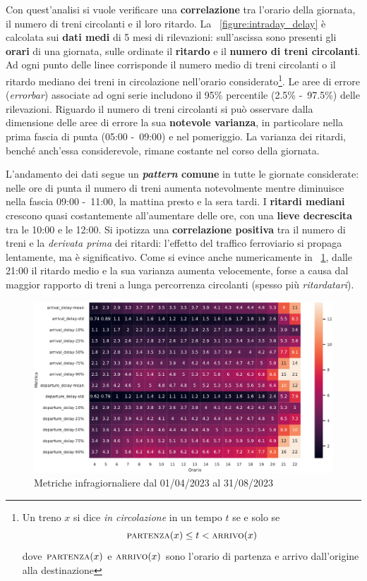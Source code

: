 \documentclass[12pt,italian]{report}
\begin{document}
Con quest'analisi si vuole verificare una \textbf{correlazione} tra
l'orario della giornata, il numero di treni circolanti e il loro
ritardo.  La \figurename~\ref{figure:intraday_delay} è calcolata sui
\textbf{dati medi} di 5 mesi di rilevazioni: sull'ascissa sono
presenti gli \textbf{orari} di una giornata, sulle ordinate il
\textbf{ritardo} e il \textbf{numero di treni circolanti}.  Ad ogni
punto delle linee corrisponde il numero medio di treni circolanti o il
ritardo mediano dei treni in circolazione nell'orario
considerato\footnote{Un treno $x$ si dice \textit{in circolazione} in
    un tempo $t$ se e solo se
    $$\textsc{partenza}(x) \leq t <
    \textsc{arrivo}(x)$$ dove $\textsc{partenza}(x)$ e
    $\textsc{arrivo}(x)$ sono l'orario di partenza e arrivo
    dall'origine alla destinazione}.  Le aree di errore
(\textit{errorbar}) associate ad ogni serie includono il 95\%
percentile (2.5\% -~97.5\%) delle rilevazioni.  Riguardo il numero di
treni circolanti si può osservare dalla dimensione delle aree di
errore la sua \textbf{notevole varianza}, in particolare nella prima
fascia di punta (05:00 -~09:00) e nel pomeriggio.  La varianza dei
ritardi, benché anch'essa considerevole, rimane costante nel corso
della giornata.

L'andamento dei dati segue un \textbf{\textit{pattern} comune} in
tutte le giornate considerate: nelle ore di punta il numero di treni
aumenta notevolmente mentre diminuisce nella fascia 09:00 -~11:00, la
mattina presto e la sera tardi.  I \textbf{ritardi mediani} crescono
quasi costantemente all'aumentare delle ore, con una \textbf{lieve
    decrescita} tra le 10:00 e le 12:00.  Si ipotizza una
\textbf{correlazione positiva} tra il numero di treni e la
\textit{derivata prima} dei ritardi: l'effetto del traffico
ferroviario si propaga lentamente, ma è significativo.  Come si evince
anche numericamente in \figurename~\ref{figure:intraday_metrics},
dalle 21:00 il ritardo medio e la sua varianza aumenta velocemente,
forse a causa dal maggior rapporto di treni a lunga percorrenza
circolanti (spesso più \textit{ritardatari}).

\begin{figure}[h]
    \includegraphics[width=1\textwidth]{images/intraday_metrics.pdf}
    \caption{Metriche infragiornaliere dal 01/04/2023 al
        31/08/2023~}
    \label{figure:intraday_metrics}
\end{figure}
\end{document}
